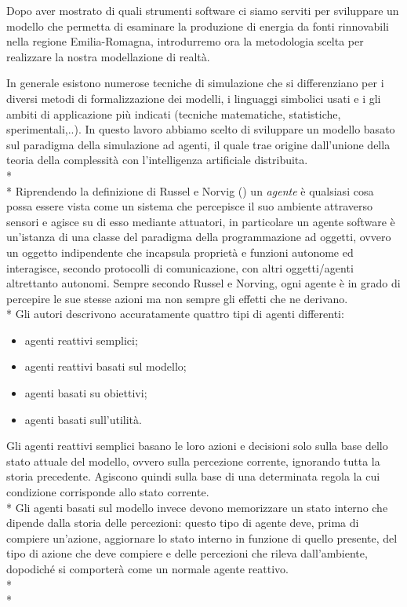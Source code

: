 \documentclass[12pt,a4paper,openright,twoside]{report}
\begin{document}
Dopo aver mostrato di quali strumenti software ci siamo serviti per sviluppare un modello che permetta di esaminare la produzione di energia da fonti rinnovabili nella regione Emilia-Romagna, introdurremo ora la metodologia scelta per realizzare la nostra modellazione di realtà.

In generale esistono numerose tecniche di simulazione che si differenziano per i diversi metodi di formalizzazione dei modelli, i linguaggi simbolici usati e i gli ambiti di applicazione più indicati (tecniche matematiche, statistiche, sperimentali,..). In questo lavoro abbiamo scelto di sviluppare un modello basato sul paradigma della simulazione ad agenti, il quale trae origine dall'unione della teoria della complessità con l'intelligenza artificiale distribuita.\\*\\*
Riprendendo la definizione di Russel e Norvig (\cite{Russell}) un \emph{agente} è qualsiasi cosa possa essere vista come un sistema che percepisce il suo ambiente attraverso sensori e agisce su di esso mediante attuatori, in particolare un agente software è un'istanza di una classe del paradigma della programmazione ad oggetti, ovvero un oggetto indipendente  che incapsula proprietà e funzioni autonome ed interagisce, secondo protocolli di comunicazione, con altri oggetti/agenti altrettanto autonomi. Sempre secondo Russel e Norving, ogni agente è in grado di percepire le sue stesse azioni ma non sempre gli effetti che ne derivano.
\\*
Gli autori descrivono accuratamente quattro tipi di agenti differenti:
\begin{itemize}
\item agenti reattivi semplici;
\item agenti reattivi basati sul modello;
\item agenti basati su obiettivi;
\item agenti basati sull'utilità.
\end{itemize}
Gli agenti reattivi semplici basano le loro azioni e decisioni solo sulla base dello stato attuale del modello, ovvero sulla percezione corrente, ignorando tutta la storia precedente. Agiscono quindi sulla base di una determinata regola la cui condizione corrisponde allo stato corrente.
\\*
Gli agenti basati sul modello invece devono memorizzare un stato interno che dipende dalla storia delle percezioni: questo tipo di agente deve, prima di compiere un'azione, aggiornare lo stato interno in funzione di quello presente, del tipo di azione che deve compiere e delle percezioni che rileva dall'ambiente, dopodiché si comporterà come un normale agente reattivo.\\* \\*
\end{document}
